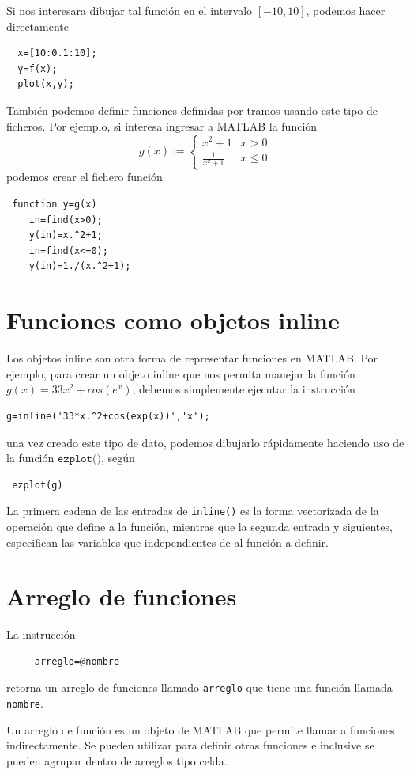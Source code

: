 \documentclass[11pt]{article}
\begin{document}
Si nos interesara dibujar tal funci\'on en el intervalo $[-10,10]$, podemos hacer 
directamente
\begin{verbatim}
  x=[10:0.1:10];
  y=f(x);
  plot(x,y);
\end{verbatim}

Tambi\'en podemos definir funciones definidas por tramos usando este tipo de ficheros. Por ejemplo, si 
interesa ingresar a MATLAB la funci\'on 
$$
g(x):=\begin{cases}
       x^2+1 		&  x>0	\\
       \frac{1}{x^2+1} & x\leq 0
      \end{cases}
$$
podemos crear el fichero funci\'on
\begin{verbatim}
 function y=g(x)
    in=find(x>0);
    y(in)=x.^2+1;
    in=find(x<=0);
    y(in)=1./(x.^2+1);
\end{verbatim}

\section{Funciones como objetos inline}

Los objetos inline son otra forma de representar funciones en MATLAB. Por ejemplo, para 
crear un objeto inline que nos permita manejar la funci\'on $g(x)=33x^2+cos(e^x)$, debemos simplemente 
ejecutar la instrucci\'on
\begin{verbatim}
g=inline('33*x.^2+cos(exp(x))','x');
\end{verbatim}
una vez creado este tipo de dato, podemos dibujarlo r\'apidamente haciendo uso de la funci\'on $\texttt{ezplot()}$, 
seg\'un
\begin{verbatim}
 ezplot(g)
\end{verbatim}
La primera cadena de las entradas de \texttt{inline()} es la forma vectorizada de la operaci\'on 
que define a la funci\'on, mientras que la segunda entrada y siguientes, especifican las variables 
que independientes de al funci\'on a definir.

\section{Arreglo de funciones}
  La instrucci\'on 
    \begin{verbatim}
     arreglo=@nombre
    \end{verbatim}
    retorna  un arreglo de funciones llamado \texttt{arreglo} que tiene 
    una funci\'on llamada \texttt{nombre}.
    
    Un arreglo de funci\'on es un objeto de MATLAB que permite llamar 
    a funciones indirectamente. Se pueden utilizar para definir otras funciones 
    e inclusive se pueden agrupar dentro de arreglos tipo celda.
\end{document}
